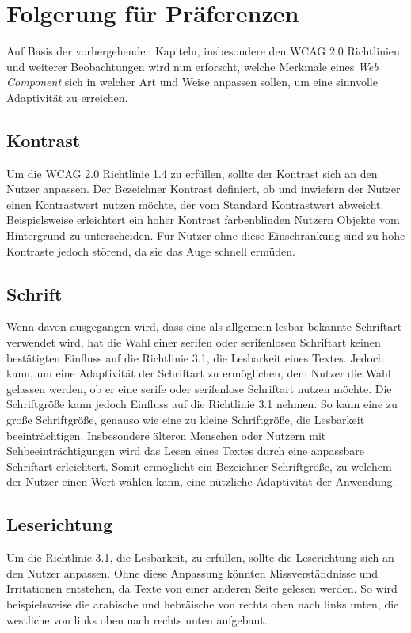 \documentclass[12pt, paper=a4, bibtotoc, toc=listof, headsepline=true]{scrreprt}
\begin{document}
\section{Folgerung für Präferenzen}
\label{sec:folFuePra}
Auf Basis der vorhergehenden Kapiteln, insbesondere den \ac{WCAG 2.0} Richtlinien und weiterer Beobachtungen wird nun erforscht, welche Merkmale eines \emph{Web Component} sich in welcher Art und Weise anpassen sollen, um eine sinnvolle Adaptivität zu erreichen.
\subsection{Kontrast}
Um die \ac{WCAG 2.0} Richtlinie 1.4 zu erfüllen, sollte der Kontrast sich an den Nutzer anpassen. Der Bezeichner Kontrast definiert, ob und inwiefern der Nutzer einen Kontrastwert nutzen möchte, der vom Standard Kontrastwert abweicht. Beispielsweise erleichtert ein hoher Kontrast farbenblinden Nutzern Objekte vom Hintergrund zu unterscheiden. Für Nutzer ohne diese Einschränkung sind zu hohe Kontraste jedoch störend, da sie das Auge schnell ermüden\cite[S.234]{balzert2009webdesign}.
\subsection{Schrift}
Wenn davon ausgegangen wird, dass eine als allgemein lesbar bekannte Schriftart verwendet wird, hat die Wahl einer serifen oder serifenlosen Schriftart keinen bestätigten Einfluss auf die Richtlinie 3.1, die Lesbarkeit eines Textes\cite[S.157-161]{barrierefreiheit}. Jedoch kann, um eine Adaptivität der Schriftart zu ermöglichen, dem Nutzer die Wahl gelassen werden, ob er eine serife oder serifenlose Schriftart nutzen möchte.
Die Schriftgröße kann jedoch Einfluss auf die Richtlinie 3.1 nehmen. So kann eine zu große Schriftgröße, genauso wie eine zu kleine Schriftgröße, die Lesbarkeit beeinträchtigen. Insbesondere älteren Menschen oder Nutzern mit Sehbeeinträchtigungen wird das Lesen eines Textes durch eine anpassbare Schriftart erleichtert\cite[S.152]{barrierefreiheit}. Somit ermöglicht ein Bezeichner Schriftgröße, zu welchem der Nutzer einen Wert wählen kann, eine nützliche Adaptivität der Anwendung. 
\subsection{Leserichtung}
\label{ref:lesRic}
Um die Richtlinie 3.1, die Lesbarkeit, zu erfüllen, sollte die Leserichtung sich an den Nutzer anpassen. Ohne diese Anpassung könnten Missverständnisse und Irritationen entstehen, da Texte von einer anderen Seite gelesen werden. So wird beispielsweise die arabische und hebräische von rechts oben nach links unten, die westliche von links oben nach rechts unten aufgebaut\cite[S.148]{emrich2013interkulturelles}.
\end{document}
